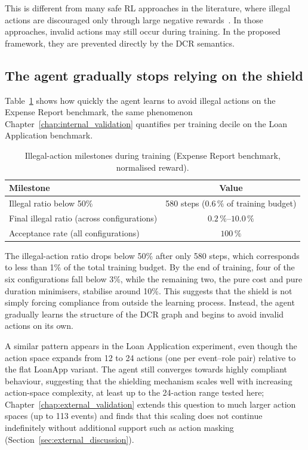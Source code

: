 This is different from many safe \ac{RL} approaches in the literature, where illegal actions are discouraged only through large negative rewards~\cite{Guan2024Rule-basedControl, Odriozola-Olalde2025TowardsFramework, Gerold2026SafeShielding}. In those approaches, invalid actions may still occur during training. In the proposed framework, they are prevented directly by the \ac{DCR} semantics.

\subsection{The agent gradually stops relying on the shield}

Table~\ref{tab:compliance_milestones} shows how quickly the agent learns to avoid illegal actions on the Expense Report benchmark, the same phenomenon Chapter~\ref{chap:internal_validation} quantifies per training decile on the Loan Application benchmark.

\begin{table}[H]
\centering
\caption{Illegal-action milestones during training
         (Expense Report benchmark, normalised reward).}
\label{tab:compliance_milestones}
{\renewcommand{\arraystretch}{1.5}
\setlength{\tabcolsep}{14pt}
\begin{tabular}{lc}
\toprule
\textbf{Milestone} & \textbf{Value} \\
\midrule
Illegal ratio below 50\% & 580 steps ($0.6\,\%$ of training budget) \\
Final illegal ratio (across configurations) & $0.2\,\%$--$10.0\,\%$ \\
Acceptance rate (all configurations) & $100\,\%$ \\
\bottomrule
\end{tabular}}
\end{table}

The illegal-action ratio drops below 50\% after only 580 steps, which corresponds to less than 1\% of the total training budget. By the end of training, four of the six configurations fall below 3\%, while the remaining two, the pure cost and pure duration minimisers, stabilise around 10\%. This suggests that the shield is not simply forcing compliance from outside the learning process. Instead, the agent gradually learns the structure of the \ac{DCR} graph and begins to avoid invalid actions on its own.

A similar pattern appears in the Loan Application experiment, even though the action space expands from 12 to 24 actions (one per event--role pair) relative to the flat LoanApp variant. The agent still converges towards highly compliant behaviour, suggesting that the shielding mechanism scales well with increasing action-space complexity, at least up to the 24-action range tested here; Chapter~\ref{chap:external_validation} extends this question to much larger action spaces (up to 113 events) and finds that this scaling does not continue indefinitely without additional support such as action masking (Section~\ref{sec:external_discussion}).

